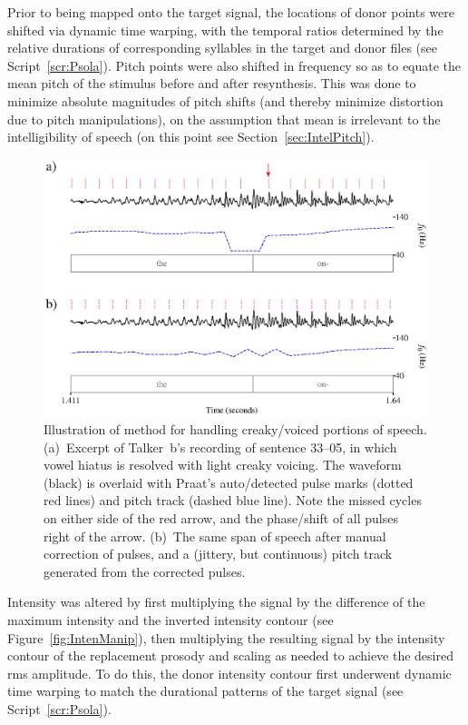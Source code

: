 Prior to being mapped onto the target signal, the locations of donor \fo{} points were shifted via dynamic time warping, with the temporal ratios determined by the relative durations of corresponding syllables in the target and donor files (see Script~\ref{scr:Psola}).  Pitch points were also shifted in frequency so as to equate the mean pitch of the stimulus before and after resynthesis.  This was done to minimize absolute magnitudes of pitch shifts (and thereby minimize distortion due to pitch manipulations), on the assumption that mean \fo{} is irrelevant to the intelligibility of speech (on this point see Section~\ref{sec:IntelPitch}).

\begin{figure}
	\begin{centering}
	\includegraphics{figures/creakJitterShimmer/creakJitterShimmer.eps}
	\caption[Handling of creaky voicing in resynthesis]{Illustration of method for handling creaky\-/voiced portions of speech.  (a)~Excerpt of Talker~\ac{b}’s recording of sentence 33–05, in which vowel hiatus is resolved with light creaky voicing.  The waveform (black) is overlaid with Praat’s auto\-/detected pulse marks (dotted red lines) and pitch track (dashed blue line).  Note the missed cycles on either side of the red arrow, and the phase\-/shift of all pulses right of the arrow.  (b)~The same span of speech after manual correction of pulses, and a (jittery, but continuous) pitch track generated from the corrected pulses.\label{fig:JitShim}}
	\end{centering}
\end{figure}

Intensity was altered by first multiplying the signal by the difference of the maximum intensity and the inverted intensity contour (see Figure~\ref{fig:IntenManip}), then multiplying the resulting signal by the intensity contour of the replacement prosody and scaling as needed to achieve the desired \ac{rms} amplitude.  To do this, the donor intensity contour first underwent dynamic time warping to match the durational patterns of the target signal (see Script~\ref{scr:Psola}).

